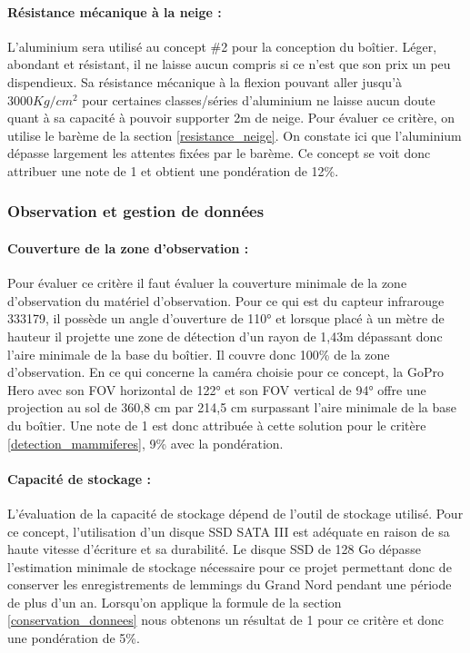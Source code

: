 \paragraph{Résistance mécanique à la neige :}
L'aluminium sera utilisé au concept \#2 pour la conception du boîtier. Léger, abondant et résistant, il ne laisse aucun compris si ce n'est que son prix un peu dispendieux.
Sa résistance mécanique à la flexion pouvant aller jusqu'à $3000Kg/cm^2$ pour certaines classes/séries d'aluminium ne laisse aucun doute quant à sa capacité à pouvoir 
supporter 2m de neige.
Pour évaluer ce critère, on utilise le barème de la section \ref{resistance_neige}. On constate ici que l'aluminium dépasse largement les attentes fixées par le barème. 
Ce concept se voit donc attribuer une note de 1 et obtient une pondération de 12\%.



\subsubsection{Observation et gestion de données}

\paragraph{Couverture de la zone d'observation :}
Pour évaluer ce critère il faut évaluer la couverture minimale de la zone d’observation du matériel d’observation.
Pour ce qui est du capteur infrarouge 333179, il possède un angle d’ouverture de 110° et lorsque placé à un mètre de hauteur il projette une zone de détection d’un rayon de 1,43m dépassant donc l’aire minimale de la base du boîtier.
Il couvre donc 100\% de la zone d’observation.
En ce qui concerne la caméra choisie pour ce concept, la GoPro Hero avec son FOV horizontal de 122° et son FOV vertical de 94° offre une projection au sol de 360,8 cm par 214,5 cm surpassant l’aire minimale de la base du boîtier. 
Une note de 1 est donc attribuée à cette solution pour le critère \ref{detection_mammiferes}, 9\% avec la pondération. 

\paragraph{Capacité de stockage :}
L’évaluation de la capacité de stockage dépend de l’outil de stockage utilisé. Pour ce concept, l’utilisation d’un disque SSD SATA III est adéquate en raison de sa haute vitesse d’écriture et sa durabilité.
Le disque SSD de 128 Go dépasse l’estimation minimale de stockage nécessaire pour ce projet permettant donc de conserver les enregistrements de lemmings du Grand Nord pendant une période de plus d’un an.
Lorsqu’on applique la formule de la section \ref{conservation_donnees} nous obtenons un résultat de 1 pour ce critère et donc une pondération de 5\%.

